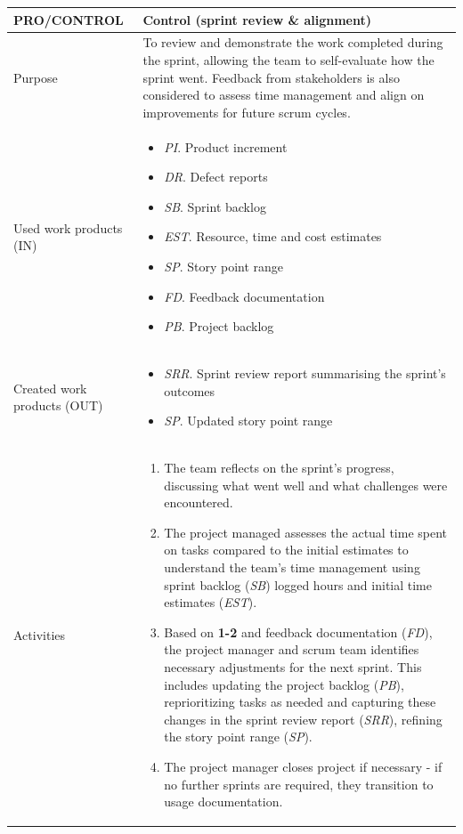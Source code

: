 \begin{table}[h!]
\begin{tabular}{l|p{}}
\hline
\textbf{PRO/CONTROL}        & \textbf{Control (sprint review \& alignment)} \\ \hline
Purpose & To review and demonstrate the work completed during the sprint, allowing the team to self-evaluate how the sprint went. Feedback from stakeholders is also considered to assess time management and align on improvements for future scrum cycles. \\ \hline
Used work products (IN)    &      
\begin{itemize}
    \item \textit{PI}. Product increment
    \item \textit{DR}. Defect reports
    \item \textit{SB}. Sprint backlog
    \item \textit{EST}.  Resource, time and cost estimates
    \item \textit{SP}. Story point range
    \item \textit{FD}. Feedback documentation
    \item \textit{PB}. Project backlog
\end{itemize}
\\ \hline
Created work products (OUT) &     
\begin{itemize}
    \item \textit{SRR}. Sprint review report summarising the sprint's outcomes 
    \item \textit{SP}. Updated story point range 
\end{itemize}
\\ \hline
Activities            &   
\begin{enumerate}
    \item The team reflects on the sprint's progress, discussing what went well and what challenges were encountered.
    \item The project managed assesses the actual time spent on tasks compared to the initial estimates to understand the team's time management using sprint backlog (\textit{SB}) logged hours and initial time estimates (\textit{EST}).
    \item Based on \textbf{1-2} and feedback documentation (\textit{FD}), the project manager and scrum team identifies necessary adjustments for the next sprint. This includes updating the project backlog (\textit{PB}), reprioritizing tasks as needed and capturing these changes in the sprint review report (\textit{SRR}), refining the story point range (\textit{SP}).
    \item The project manager closes project if necessary - if no further sprints are required, they transition to usage documentation.
\end{enumerate}
\end{tabular}
\label{control_process}
\end{table}


